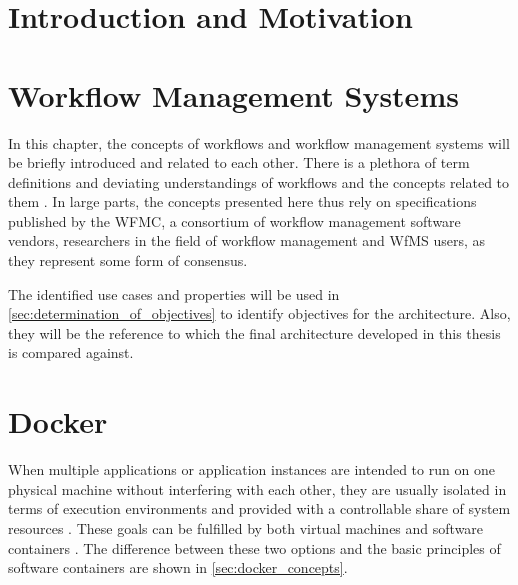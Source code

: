 \documentclass[language=english,noinputenc]{wiwwuwordrprt}
\begin{document}
  \EinfTitelseite

  \tableofcontents
  \listoffigures
  \listoftables

  

  \clearpage
  


  \chapter{Introduction and Motivation} %
    \label{cha:introduction_and_motivation}
    

  \chapter{Workflow Management Systems} %
    \label{cha:workflow_management_systems}

    In this chapter, the concepts of workflows and workflow management systems will be briefly introduced and related to each other.
    There is a plethora of term definitions and deviating understandings of workflows and the concepts related to them \cite{Casati1999Specification}.
    In large parts, the concepts presented here thus rely on specifications published by the \ac{WFMC}, a consortium of workflow management software vendors, researchers in the field of workflow management and \ac{WfMS} users, as they represent some form of consensus.

    The identified use cases and properties will be used in \ref{sec:determination_of_objectives} to identify objectives for the architecture. Also, they will be the reference to which the final architecture developed in this thesis is compared against.

    

  \chapter{Docker} %
    \label{cha:docker}

    When multiple applications or application instances are intended to run on one physical machine without interfering with each other, they are usually isolated in terms of execution environments and provided with a controllable share of system resources \cite{Felter2014Updated}. These goals can be fulfilled by both virtual machines and software containers \cite{Ruiz2015Performance}. The difference between these two options and the basic principles of software containers are shown in \ref{sec:docker_concepts}.
\end{document}
